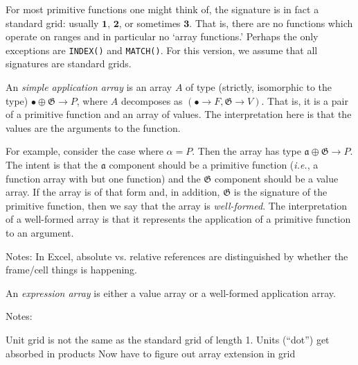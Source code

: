 \documentclass[11pt]{article}
\newcommand{\gr}[1]{\mathfrak{#1}}
\newcommand{\GG}{\gr{G}}
\newcommand{\unit}{\bullet}
\newcommand{\one}{\mathbf{1}}
\newcommand{\two}{\mathbf{2}}
\newcommand{\three}{\mathbf{3}}
\begin{document}
For most primitive functions one might think of, the signature is in fact a
standard grid: usually $\one$, $\two$, or sometimes $\three$. That is, there are
no functions which operate on ranges and in particular no `array functions.'
Perhaps the only exceptions are \texttt{INDEX()} and \texttt{MATCH()}. For this
version, we assume that all signatures are standard grids.

An \emph{simple application array} is an array $A$ of type (strictly, isomorphic
to the type) $\unit \oplus \gr{G} \to P$, where $A$ decomposes as $(\unit\to F, \GG \to
V)$. That is, it is a pair of a primitive function and an array of values. The
interpretation here is that the values are the arguments to the function. 



For example, consider the case where $\alpha = P$. Then the array has type
$\gr{a}\oplus\gr{G} \to P$. The intent is that the $\gr{a}$ component should be a
primitive function (\emph{i.e.}, a function array with but one function) and the
$\gr{G}$ component should be a value array. If the array is of that form and, in
addition, $\gr{G}$ is the signature of the primitive function, then we say that
the array is \emph{well-formed}. The interpretation of a well-formed array is
that it represents the application of a primitive function to an argument.



Notes: In Excel, absolute vs. relative references are distinguished by whether
the frame/cell things is happening.





An \emph{expression array} is either a value array or a well-formed application
array.

Notes:

Unit grid is not the same as the standard grid of length 1.
Units (``dot'') get absorbed in products
Now have to figure out array extension in grid

                                                                                                   



\end{document}

